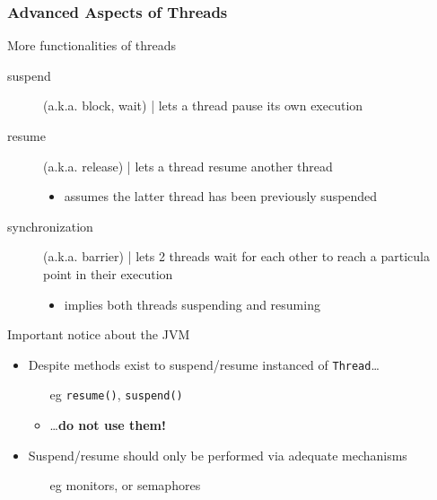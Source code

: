 \documentclass{beamer}\mode<presentation>{\usetheme{AMSBolognaFC}}
\begin{document}
\begin{frame}[allowframebreaks]
    \frametitle{Advanced Aspects of Threads}



    \begin{exampleblock}{More functionalities of threads}
        \begin{description}
            \item[suspend] (a.k.a. block, wait)  | lets a thread pause its own execution

            \item[resume] (a.k.a. release) | lets a thread resume another thread
            \begin{itemize}
                \item assumes the latter thread has been previously suspended
            \end{itemize}

            \item[synchronization] (a.k.a. barrier) | lets 2 threads wait for each other to reach a particula point in their execution
            \begin{itemize}
                \item implies both threads suspending and resuming
            \end{itemize}
        \end{description}
    \end{exampleblock}

    \begin{alertblock}{Important notice about the JVM}
        \begin{itemize}
            \item Despite methods exist to suspend/resume instanced of \texttt{Thread}\ldots
            \begin{itemize}
                \item[eg] \texttt{resume()}, \texttt{suspend()}
                \item \ldots \textbf{do not use them!}
            \end{itemize}

            \item Suspend/resume should only be performed via adequate mechanisms
            \begin{itemize}
                \item[eg] monitors, or semaphores
            \end{itemize}


\end{itemize}
\end{alertblock}
\end{frame}
\end{document}
